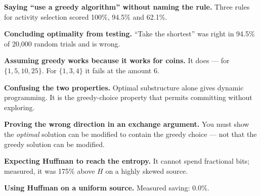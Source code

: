 \begin{pitfall}
\begin{tight}
  \item \textbf{Saying ``use a greedy algorithm'' without naming the rule.}
        Three rules for activity selection scored 100\%, 94.5\% and 62.1\%.
  \item \textbf{Concluding optimality from testing.} ``Take the shortest'' was
        right in 94.5\% of 20{,}000 random trials and is wrong.
  \item \textbf{Assuming greedy works because it works for coins.} It does ---
        for $\{1,5,10,25\}$. For $\{1,3,4\}$ it fails at the amount 6.
  \item \textbf{Confusing the two properties.} Optimal substructure alone gives
        dynamic programming. It is the greedy-choice property that permits
        committing without exploring.
  \item \textbf{Proving the wrong direction in an exchange argument.} You must
        show the \emph{optimal} solution can be modified to contain the greedy
        choice --- not that the greedy solution can be modified.
  \item \textbf{Expecting Huffman to reach the entropy.} It cannot spend
        fractional bits; measured, it was 175\% above $H$ on a highly skewed
        source.
  \item \textbf{Using Huffman on a uniform source.} Measured saving: 0.0\%.
\end{tight}
\end{pitfall}

